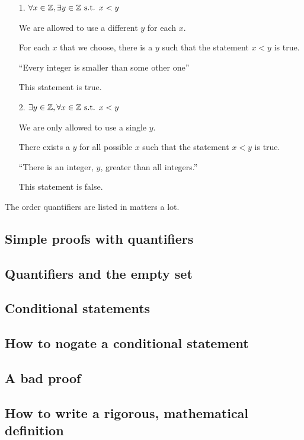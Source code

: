 \begin{enumerate}
  \item[1.] \(\forall x \in \mathbb{Z}, \exists y \in \mathbb{Z} \text{ s.t. } x < y\)

        We are allowed to use a different \(y\) for each \(x\).

        For each \(x\) that we choose, there is a \(y\) such that the statement \(x < y\) is true.

        ``Every integer is smaller than some other one''

        This statement is true.

  \item[2.] \(\exists y \in \mathbb{Z}, \forall x \in \mathbb{Z} \text{ s.t. } x < y\)

        We are only allowed to use a single \(y\).

        There exists a \(y\) for all possible \(x\) such that the statement \(x < y\) is true.

        ``There is an integer, \(y\), greater than all integers.''

        This statement is false.
\end{enumerate}

The order quantifiers are listed in matters a lot.

\subsection{Simple proofs with quantifiers}

\subsection{Quantifiers and the empty set}

\subsection{Conditional statements}

\subsection{How to nogate a conditional statement}

\subsection{A bad proof}

\subsection{How to write a rigorous, mathematical definition}


